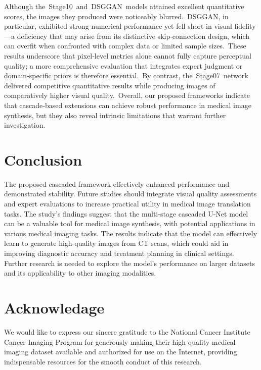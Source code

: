 \documentclass[a4paper, times, 10pt,twocolumn]{article}
\begin{document}
Although the Stage10 and DSGGAN models attained excellent quantitative scores, the images they produced were noticeably blurred. DSGGAN, in particular, exhibited strong numerical performance yet fell short in visual fidelity—a deficiency that may arise from its distinctive skip‑connection design, which can overfit when confronted with complex data or limited sample sizes. These results underscore that pixel‑level metrics alone cannot fully capture perceptual quality; a more comprehensive evaluation that integrates expert judgment or domain‑specific priors is therefore essential. By contrast, the Stage07 network delivered competitive quantitative results while producing images of comparatively higher visual quality. Overall, our proposed frameworks indicate that cascade‑based extensions can achieve robust performance in medical image synthesis, but they also reveal intrinsic limitations that warrant further investigation.

\section{Conclusion}
The proposed cascaded framework effectively enhanced performance and demonstrated stability. Future studies should integrate visual quality assessments and expert evaluations to increase practical utility in medical image translation tasks. The study's findings suggest that the multi-stage cascaded U-Net model can be a valuable tool for medical image synthesis, with potential applications in various medical imaging tasks. The results indicate that the model can effectively learn to generate high-quality images from CT scans, which could aid in improving diagnostic accuracy and treatment planning in clinical settings. Further research is needed to explore the model's performance on larger datasets and its applicability to other imaging modalities.

\section*{Acknowledage}
We would like to express our sincere gratitude to the National Cancer Institute Cancer Imaging Program for generously making their high-quality medical imaging dataset available and authorized for use on the Internet, providing indispensable resources for the smooth conduct of this research.


% 

\end{document}
